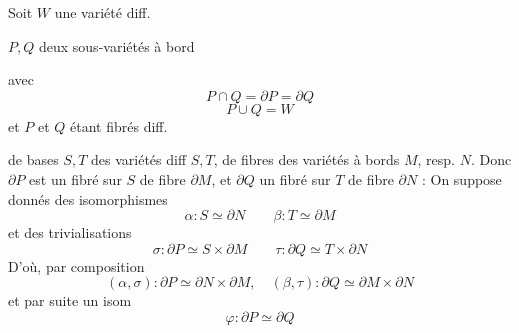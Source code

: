 Soit $W$ une variété  diff.

$P,Q$ deux sous-variétés à bord

avec
\[
P\cap Q=\partial P=\partial Q
\]
\[
P\cup Q=W
\]
et $P$ et $Q$ étant  fibrés diff.

de bases $S,T$ des variétés diff  $S,T$, de fibres des variétés à bords $M$, resp. $N$. Donc $\partial P$ est un fibré sur $S$ de fibre $\partial M$, et $\partial Q$ un fibré sur $T$ de fibre $\partial N$ :
On suppose donnés des isomorphismes
\[
\alpha:S\simeq\partial N\qquad\beta:T\simeq\partial M
\]
et  des trivialisations
\[
\sigma:\partial P\simeq S\times\partial M\qquad\tau:\partial Q\simeq T\times\partial N
\]
D'où, par composition
\[
(\alpha,\sigma):\partial P\simeq\partial N\times\partial M,\quad(\beta,\tau):\partial Q\simeq\partial M\times\partial N
\]
et par suite un isom
\[
\varphi:\partial P\simeq\partial Q
\]
